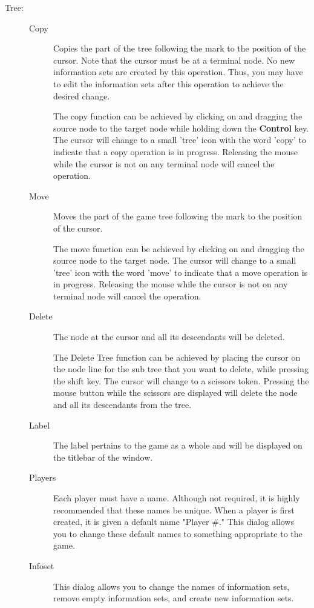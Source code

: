 \begin{description}
\item[Tree:]
\begin{description}
\item[Copy] Copies the part of the tree following the mark to the
position of the cursor.  Note that the cursor must be at a terminal
node.  No new information sets are created by this operation.  Thus,
you may have to edit the information sets after this operation to
achieve the desired change.

 The copy function can be
achieved by clicking on and dragging the source node to the target
node while holding down the {\bf Control} key.  The cursor will change
to a small 'tree' icon with the word 'copy' to indicate that a copy
operation is in progress.  Releasing the mouse while the cursor is not
on any terminal node will cancel the operation.
\item[Move] Moves the part of the game tree following the mark to the
position of the cursor.

 The move function can be
achieved by clicking on and dragging the source node to the target
node. The cursor will change to a small 'tree' icon with the word
'move' to indicate that a move operation is in progress.  Releasing
the mouse while the cursor is not on any terminal node will cancel the
operation.
\item[Delete] The node at the cursor and all its descendants will be
deleted.

 The Delete Tree function can be
achieved by placing the cursor on the node line for the sub tree that
you want to delete, while pressing the shift key.  The cursor will
change to a scissors token.  Pressing the mouse button while the
scissors are displayed will delete the node and all its descendants
from the tree.
\item[Label] The label pertains to the game as a whole and will be
displayed on the titlebar of the window.
\item[Players] Each player must have a name.  Although not required,
it is highly recommended that these names be unique.  When a player is
first created, it is given a default name "Player \#."  This dialog
allows you to change these default names to something appropriate to
the game.
\item[Infoset] This dialog allows you to change the names of
information sets, remove empty information sets, and create new
information sets.
\end{description}
\end{description}

